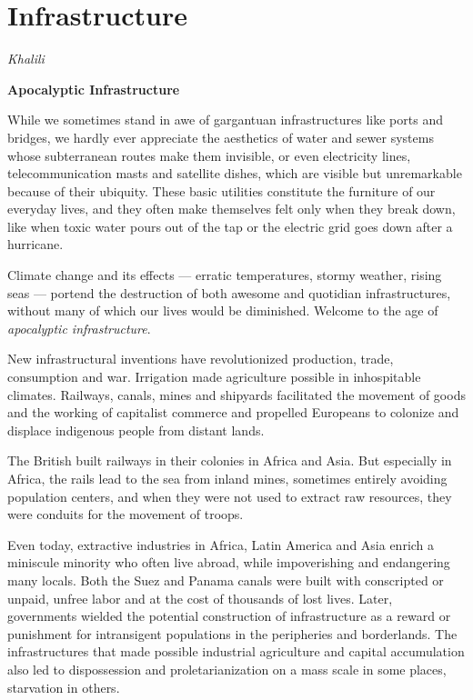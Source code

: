 \documentclass[
]{book}
\begin{document}
\hypertarget{infrastructure}{%
\section{Infrastructure}\label{infrastructure}}

\emph{Khalili}

\textbf{Apocalyptic Infrastructure}

While we sometimes stand in awe of gargantuan infrastructures like ports and bridges, we hardly ever appreciate the aesthetics of water and sewer systems whose subterranean routes make them invisible, or even electricity lines, telecommunication masts and satellite dishes, which are visible but unremarkable because of their ubiquity. These basic utilities constitute the furniture of our everyday lives, and they often make themselves felt only when they break down, like when toxic water pours out of the tap or the electric grid goes down after a hurricane.

Climate change and its effects --- erratic temperatures, stormy weather, rising seas --- portend the destruction of both awesome and quotidian infrastructures, without many of which our lives would be diminished. Welcome to the age of \emph{apocalyptic infrastructure}.

New infrastructural inventions have revolutionized production, trade, consumption and war. Irrigation made agriculture possible in inhospitable climates. Railways, canals, mines and shipyards facilitated the movement of goods and the working of capitalist commerce and propelled Europeans to colonize and displace indigenous people from distant lands.

The British built railways in their colonies in Africa and Asia. But especially in Africa, the rails lead to the sea from inland mines, sometimes entirely avoiding population centers, and when they were not used to extract raw resources, they were conduits for the movement of troops.

Even today, extractive industries in Africa, Latin America and Asia enrich a miniscule minority who often live abroad, while impoverishing and endangering many locals. Both the Suez and Panama canals were built with conscripted or unpaid, unfree labor and at the cost of thousands of lost lives. Later, governments wielded the potential construction of infrastructure as a reward or punishment for intransigent populations in the peripheries and borderlands. The infrastructures that made possible industrial agriculture and capital accumulation also led to dispossession and proletarianization on a mass scale in some places, starvation in others.
\end{document}
